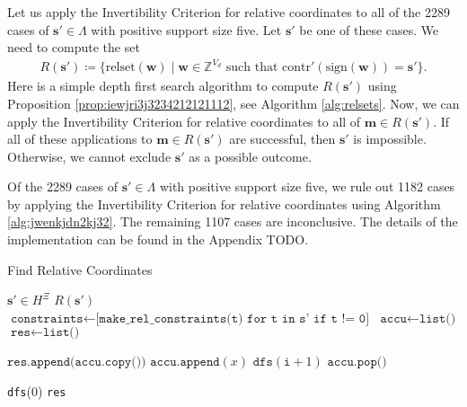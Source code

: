 Let us apply the Invertibility Criterion for relative coordinates to all of the 2289 cases of \( \mathbf{s}' \in \Lambda \) with positive support size five. Let \( \mathbf{s}' \) be one of these cases. We need to compute the set 
\begin{align*}
    R(\mathbf{s}') \coloneqq \{ \mathrm{relset}(\mathbf{w}) \mid  \mathbf{w} \in \mathbb Z^{V_d} \text{ such that } \mathrm{contr}'(\mathrm{sign}(\mathbf{w})) = \mathbf{s}' \}.
\end{align*}
Here is a simple depth first search algorithm to compute \( R(\mathbf{s}') \) using Proposition \ref{prop:iewjri3j3234212121112}, see Algorithm \ref{alg:relsets}. Now, we can apply the Invertibility Criterion for relative coordinates to all of \( \mathbf{m} \in R(\mathbf{s}') \). If all of these applications to \( \mathbf{m} \in R(\mathbf{s}') \) are successful, then \( \mathbf{s}' \) is impossible. Otherwise, we cannot exclude \( \mathbf{s}' \) as a possible outcome. 

Of the 2289 cases of \( \mathbf{s}' \in \Lambda \) with positive support size five, we rule out 1182 cases by applying the Invertibility Criterion for relative coordinates using Algorithm \ref{alg:jwenkjdn2kj32}. The remaining 1107 cases are inconclusive. The details of the implementation can be found in the Appendix TODO.

\begin{algorithm}[H]
\caption{Find Relative Coordinates}
\label{alg:relsets}
\begin{algorithmic}[1]
\Require $\mathbf{s}' \in H^{\Xi}$
\Ensure $R(\mathbf{s}')$
    \State $\texttt{constraints} \gets \texttt{[make\_rel\_constraints(t) for t in s' if t != 0]}$
    \State $\texttt{accu} \gets \texttt{list()}$ 
    \State $\texttt{res} \gets \texttt{list()}$ 
    
            \State $\texttt{res.append(accu.copy())}$
            \State \Return
        \EndIf
            \State $\texttt{accu.append}(x)$
            \State $\texttt{dfs}(\texttt{i} + 1)$
            \State $\texttt{accu.pop()}$
        \EndFor
    \EndFunction

    \State \texttt{dfs}(0)
    \State \Return \texttt{res}
\EndFunction
\end{algorithmic}
\end{algorithm}

